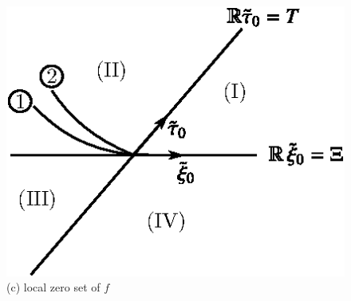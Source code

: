 \setcounter{figure}{0}
\begin{figure}[H]
\centering
\includegraphics{figure/fig76-5.1c.eps}
\caption{(c) local zero set of $f$}
\end{figure}

